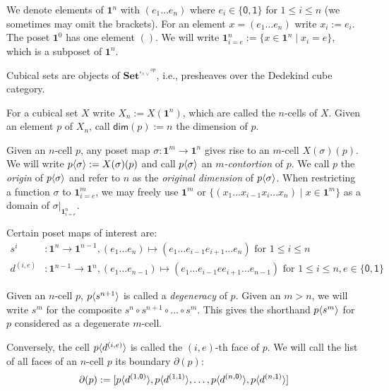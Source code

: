 \documentclass{llncs}
\newcommand{\mdef}{:=}
\newcommand{\mname}[1]{\textit{{#1}}}
\newcommand{\mlist}[1]{[ {#1} ]}
\newcommand{\join}{\wedge}
\newcommand{\meet}{\vee}
\newcommand{\dedekind}{\square_{\join \meet}}
\newcommand{\pint}[1]{\mathbf{1}^{#1}}
\newcommand{\pintrestr}[3]{\mathbf{1}^{#1}_{{#2}={#3}}}
\newcommand{\izero}{\mathsf{0}}
\newcommand{\ione}{\mathsf{1}}
\newcommand{\restrict}[2]{{#1}|_{#2}}
\newcommand{\psh}[1]{\mathbf{Set}^{{#1}^{op}}}
\renewcommand{\dim}[1]{\mathsf{dim}({#1})}
\newcommand{\smap}[1]{s^{{#1}}}
\newcommand{\dmap}[2]{d^{({#1} , {#2})}}
\newcommand{\cont}[2]{\ensuremath{ \ifthenelse{\equal{#2}{}}{#1}{{#1}\langle{#2}\rangle}} }
\newcommand{\boundary}[1]{\partial({#1})}
\begin{document}
We denote elements of $\pint{n}$ with $(e_1 \ldots e_n)$ where $e_i \in
\{\izero, \ione\}$ for $1 \leq i \leq n$ (we sometimes may omit the brackets).
For an element $x = (e_1 \ldots e_n)$ write $x_i \mdef e_i$. The poset
$\pint{0}$ has one element $()$. We will write $\pintrestr{n}{i}{e} \mdef
\{ x \in \pint{n} \mid x_i = e \}$, which is a subposet of $\pint{n}$.

\begin{definition}
Cubical sets are objects of $\psh{\dedekind}$, i.e., presheaves over the
Dedekind cube category.
\end{definition}

For a cubical set $X$ write $X_n \mdef X(\pint{n})$,
which are called the $n$-cells of $X$. Given an element $p$ of $X_n$, call
$\dim{p} \mdef n$ the dimension of $p$.

Given an $n$-cell $p$, any poset map $\sigma : \pint{m} \to \pint{n}$ gives rise to an $m$-cell
$X(\sigma)(p)$. We will write $\cont{p}{\sigma} \mdef X(\sigma)(p)$ and call
$\cont{p}{\sigma}$ an \mname{$m$-contortion} of $p$. We call $p$ the \mname{origin}
of $\cont{p}{\sigma}$ and refer to $n$ as the \mname{original dimension} of
$\cont{p}{\sigma}$. When restricting a function $\sigma$ to
$\pintrestr{m}{i}{e}$, we may freely use $\pint{m}$ or $\{ (x_1 ... x_{i-1}x_i
... x_n ) \mid x \in \pint{m} \}$ as a domain of $\restrict{\sigma}{\pintrestr{n}{i}{e}}$.

Certain poset maps of interest are:
\begin{align*}
  \smap{i} &: \pint{n} \to \pint{n-1}, (e_1 \ldots e_n) \mapsto (e_1 \ldots e_{i-1} e_{i+1} \ldots e_n) \text{ for } 1 \leq i \leq n\\
  \dmap{i}{e} &: \pint{n-1} \to \pint{n}, 
                (e_1 \ldots e_{n-1}) \mapsto (e_1 \ldots e_{i-1} e e_{i+1} \ldots e_{n-1}) \text{ for } 1 \leq i \leq n, e \in \{\izero,\ione\}
\end{align*}

Given an $n$-cell $p$, $\cont{p}{\smap{n+1}}$ is called a \mname{degeneracy} of
$p$. Given an $m > n$, we will write $\smap{m}$ for the composite
$\smap{n} \circ \smap{n+1} \circ \ldots \circ \smap{m}$. This gives the shorthand
$\cont{p}{\smap{m}}$ for $p$ considered as a degenerate $m$-cell.

Conversely, the cell $\cont{p}{\dmap{i}{e}}$ is called the $(i,e)$-th face of $p$. We
will call the list of all faces of an $n$-cell $p$ its boundary $\boundary{p}$:
$$\boundary{p} \mdef \mlist{ \cont{p}{\dmap{1}{\izero}},
  \cont{p}{\dmap{1}{\ione}} , \ldots , \cont{p}{\dmap{n}{\izero}}, \cont{p}{\dmap{n}{\ione}} }$$
\end{document}
